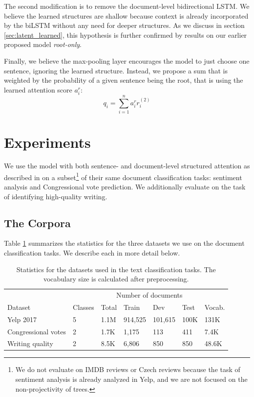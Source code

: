 The second modification is to remove the document-level bidirectional LSTM. We believe the learned structures are shallow because context is already incorporated by the biLSTM without any need for deeper structures. As we discuss in section \ref{sec:latent_learned}, this hypothesis is further confirmed by results on our earlier proposed model \emph{root-only}. 

Finally, we believe the max-pooling layer encourages the model to just choose one sentence, ignoring the learned structure. Instead, we propose a sum that is weighted by the probability of a given sentence being the root, that is using the learned attention score $a_i^r$:
\begin{equation}
q_i=\sum_{i=1}^n a_i^r r_i^{(2)}
\end{equation}



\section{Experiments}
We use the model with both sentence- and document-level structured attention as described in  on a subset\footnote{We do not evaluate on IMDB reviews or Czech reviews because the task of sentiment analysis is already analyzed in Yelp, and we are not focused on the non-projectivity of trees.} of their same document classification tasks: sentiment analysis and Congressional vote prediction. We additionally evaluate on the task of identifying high-quality writing. 

\subsection{The Corpora}
Table \ref{tab:latent_corpora} summarizes the statistics for the three datasets we use on the document classification tasks. We describe each in more detail below. 

\begin{table}[t]
\centering
\begin{tabular}{lllllll}
\toprule
                    &         & \multicolumn{4}{c}{Number of documents}  &             \\ \cline{3-6}
Dataset             & Classes & Total & Train & Dev & Test    & Vocab. \\ \hline\hline
Yelp 2017           & 5       & 1.1M  & 914,525  & 101,615     & 100K & 131K        \\
Congressional votes & 2       & 1.7K  & 1,175    & 113         & 411     & 7.4K        \\
Writing quality     & 2       & 8.5K  & 6,806    & 850         & 850     & 48.6K       \\ \bottomrule
\end{tabular}
\caption{Statistics for the datasets used in the text classification tasks. The vocabulary size is calculated after preprocessing.}
\label{tab:latent_corpora}
\end{table}

